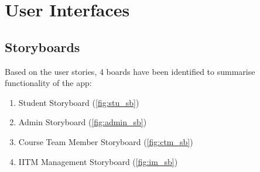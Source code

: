 \section{User Interfaces}


\subsection{Storyboards}
Based on the user stories, 4 boards have been identified to summarise functionality of the app:
\begin{enumerate}
    \tightlist
    \item Student Storyboard (\autoref{fig:stu_sb})
    \item Admin Storyboard (\autoref{fig:admin_sb})
    \item Course Team Member Storyboard (\autoref{fig:ctm_sb})
    \item IITM Management Storyboard (\autoref{fig:im_sb})
\end{enumerate}


